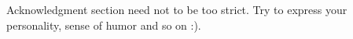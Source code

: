 \begin{acknowledgments}
Acknowledgment section need not to be too strict. Try to express your personality, sense of humor and so on :). 



\end{acknowledgments}
